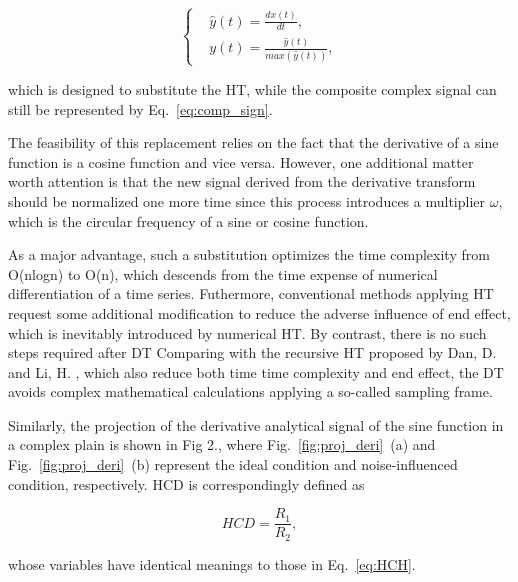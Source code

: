 \documentclass[preprint, 3p, times, compress, 11pt]{elsarticle}
\begin{document}
\begin{equation}
    \left \{
        \begin{aligned} 
            &\hat{y}(t) = \frac{dx(t)}{dt}, \\ 
            &y(t) = \frac{\hat{y}(t)}{max \left( \hat{y}(t) \right)},
        \end{aligned} 
    \right. 
    \label{eq:deri}
\end{equation}

which is designed to substitute the HT, while the composite complex 
signal can still be represented by Eq.~\eqref{eq:comp_sign}.

The feasibility of this replacement relies on the 
fact that the derivative of a sine function is a cosine function and 
vice versa. 
However, one additional matter worth attention is that 
the new signal derived from the derivative transform should be normalized 
one more time since this process introduces a multiplier $\omega$, which 
is the circular frequency of a sine or cosine function. 

As a major advantage, such a substitution optimizes the time complexity 
from O(nlogn) to O(n), which 
descends from the time expense of numerical differentiation of a time series. 
Futhermore, conventional methods applying HT request some additional modification 
to reduce the adverse influence of end effect, which is inevitably introduced 
by numerical HT. By contrast, there is no such steps required after DT 
Comparing with the recursive HT proposed by Dan, D. and Li, H. \cite{dan2022monitoring}, 
which also reduce both time time complexity and end effect, 
the DT avoids complex mathematical calculations applying a so-called sampling frame.

Similarly, the projection of the derivative analytical signal of the sine 
function in a complex plain is shown in Fig 2., where Fig.~\ref{fig:proj_deri}~(a) 
and Fig.~\ref{fig:proj_deri}~(b) represent the ideal condition and 
noise-influenced condition, respectively. HCD is correspondingly defined as 

\begin{equation}
    HCD = \frac{R_1}{R_2},
    \label{eq:HCD}
\end{equation}

whose variables have identical meanings to those in Eq.~\eqref{eq:HCH}.

\end{document}
